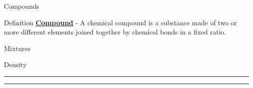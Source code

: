 \documentclass[../../main.tex]{subfiles}
\begin{document}
\begin{outline}[enumerate]
    \1 Compounds

    \begin{displayquote}
        \begin{boxBox}{Definition}
            {\large\textbf{\underline{Compound}}} - A chemical compound is a substance made of two or more different elements joined together by chemical bonds in a fixed ratio.
            \autocite{SimpleWiki-ChemicalCompound}
        \end{boxBox}
    \end{displayquote}

    \1 Mixtures

\end{outline}

\newpage
\begin{formulaBox}{Density}
    \color{dracPurple}\rule{\textwidth}{1.5pt}\color{black}
    \color{dracPurple}\rule{\textwidth}{1.5pt}\color{black}
\end{formulaBox}

\printbibliography
\end{document}
